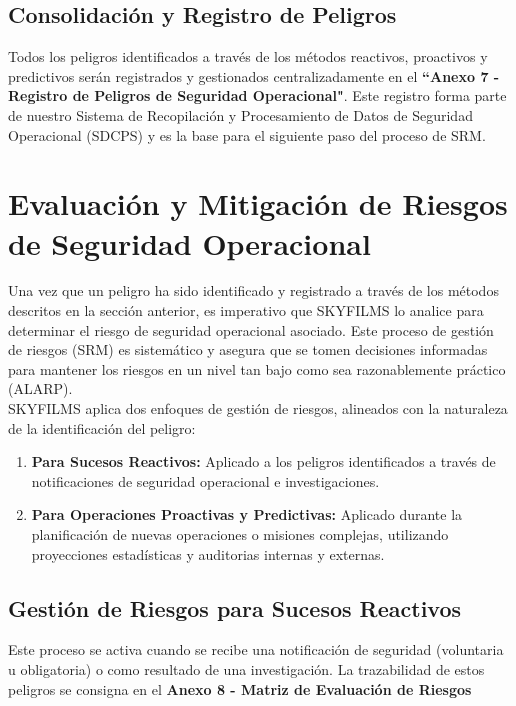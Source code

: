 \subsection{Consolidación y Registro de Peligros}

Todos los peligros identificados a través de los métodos reactivos, proactivos y predictivos serán registrados y gestionados centralizadamente en el \textbf{“Anexo 7 - Registro de Peligros de Seguridad Operacional"}. Este registro forma parte de nuestro Sistema de Recopilación y Procesamiento de Datos de Seguridad Operacional (SDCPS) y es la base para el siguiente paso del proceso de SRM.

\section{Evaluación y Mitigación de Riesgos de Seguridad Operacional}
Una vez que un peligro ha sido identificado y registrado a través de los métodos descritos en la sección anterior, es imperativo que SKYFILMS lo analice para determinar el riesgo de seguridad operacional asociado. Este proceso de gestión de riesgos (SRM) es sistemático y asegura que se tomen decisiones informadas para mantener los riesgos en un nivel tan bajo como sea razonablemente práctico (ALARP).\\

SKYFILMS aplica dos enfoques de gestión de riesgos, alineados con la naturaleza de la identificación del peligro:

\begin{enumerate}
    \item \textbf{Para Sucesos Reactivos:} Aplicado a los peligros identificados a través de notificaciones de seguridad operacional e investigaciones.
    \item \textbf{Para Operaciones Proactivas y Predictivas:} Aplicado durante la planificación de nuevas operaciones o misiones complejas, utilizando proyecciones estadísticas y auditorias internas y externas.
\end{enumerate}

\subsection{Gestión de Riesgos para Sucesos Reactivos}
Este proceso se activa cuando se recibe una notificación de seguridad (voluntaria u obligatoria) o como resultado de una investigación. La trazabilidad de estos peligros se consigna en el \textbf{Anexo 8 - Matriz de Evaluación de Riesgos}\\

